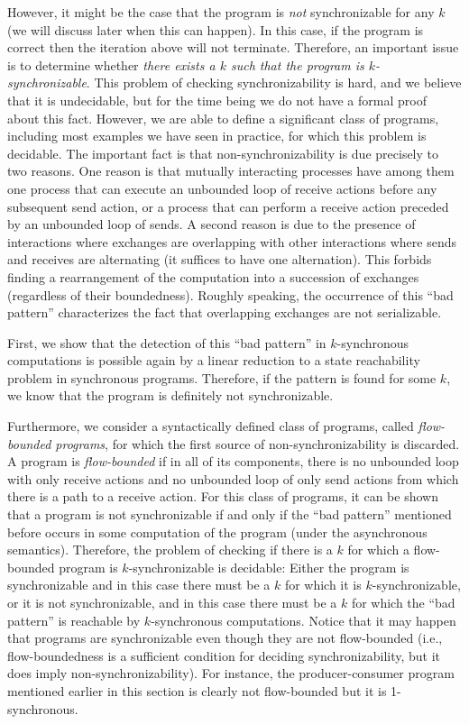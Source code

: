 However, it might be the case that the program is {\em not} synchronizable for any $k$ (we will discuss later when this can happen). In this case, if the program is correct then the iteration above will not terminate. Therefore, an important issue is to determine whether {\em there exists a $k$ such that the program is $k$-synchronizable}. This problem of checking synchronizability is hard, and we believe that it is undecidable, but for the time being we do not have a formal proof about this fact. However, we are able to define a significant class of programs, including most examples we have seen in practice, for which this problem is decidable.  The important fact is that non-synchronizability is due precisely to two reasons. One reason is that mutually interacting processes have among them one process that can execute an unbounded loop of receive actions before any subsequent send action, or a process that can perform a receive action preceded by an unbounded loop of sends. 
A second reason is due to the presence of interactions where exchanges are overlapping with other interactions where sends and receives are alternating (it suffices to have one alternation). This forbids finding a rearrangement of the computation into a succession of exchanges (regardless of their boundedness). Roughly speaking, the occurrence of this “bad pattern” characterizes the fact that overlapping exchanges are not serializable. 

First, we show that the detection of this “bad pattern” in $k$-synchronous computations is possible again by a linear reduction to a state reachability problem in synchronous programs. Therefore, if the pattern is found for some $k$, we know that the program is definitely not synchronizable. 

Furthermore, we consider a syntactically defined class of programs, called {\em flow-bounded programs}, for which the first source of non-synchronizability is  discarded. A program is {\em flow-bounded} if in all of its components, there is no unbounded loop with only receive actions and no unbounded loop of only send actions from which there is a path to a receive action. For this class of programs, it can be shown that a program is not synchronizable if and only if the “bad pattern” mentioned before occurs in some computation of the program (under the asynchronous semantics). Therefore, the problem of checking if there is a $k$ for which a flow-bounded program is $k$-synchronizable is decidable: Either the program is synchronizable and in this case there must be a $k$ for which it is $k$-synchronizable, or it is not synchronizable, and in this case there must be a $k$ for which the “bad pattern” is reachable by $k$-synchronous computations. Notice that it may happen that programs are synchronizable even though they are not flow-bounded (i.e., flow-boundedness is a sufficient condition for deciding synchronizability, but it does imply non-synchronizability). For instance, the producer-consumer program mentioned earlier in this section is clearly not flow-bounded but it is 1-synchronous. 

